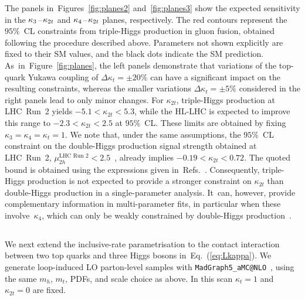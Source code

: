 \documentclass{SciPost}
\begin{document}
The panels in~Figures~\ref{fig:planes2} and~\ref{fig:planes3} show the expected sensitivity in the $\kappa_3\hspace{0.25mm}$--$\hspace{0.25mm}\kappa_{2t}$ and $\kappa_4\hspace{0.25mm}$--$\hspace{0.25mm}\kappa_{2t}$ planes, respectively. The red contours represent the $95\%$~CL constraints from triple-Higgs production in gluon fusion, obtained following the procedure described above. Parameters not shown explicitly are fixed to their SM values, and the black dots indicate the SM prediction. As~in~Figure~\ref{fig:planes}, the left panels demonstrate that variations of the top-quark Yukawa coupling of $\Delta\kappa_t=\pm20\%$ can have a significant impact on the resulting constraints, whereas the smaller variations $\Delta\kappa_t=\pm5\%$ considered in the right panels lead to only minor changes. For $\kappa_{2t}$, triple-Higgs production at LHC~Run~2 yields $-5.1 < \kappa_{2t} < 5.3$, while the HL-LHC is expected to improve this range to $-2.3 < \kappa_{2t} < 2.5$ at $95\%$~CL. These limits are obtained by fixing $\kappa_3=\kappa_4=\kappa_t=1$. We note that, under the same assumptions, the $95\%$~CL constraint on the double-Higgs production signal strength obtained at LHC~Run~2, $\mu_{2h}^{\text{LHC~Run~2}}<2.5$~\cite{CMS:2026nuu}, already implies $-0.19 < \kappa_{2t} < 0.72$. The quoted bound is obtained using the expressions given in~Refs.~\cite{Buchalla:2018yce,Brivio:2025sib}. Consequently, triple-Higgs production is not expected to provide a stronger constraint on $\kappa_{2t}$ than double-Higgs production in a single-parameter analysis. It~can, however, provide complementary information in multi-parameter fits, in particular when these involve~$\kappa_4$, which can only be weakly constrained by double-Higgs production~\cite{Bizon:2018syu,Borowka:2018pxx,Li:2024iio,Ding:2026qto}.

\subsection{}
\label{sec:kappa3t}

We next extend the inclusive-rate parametrisation to the contact interaction between two top quarks and three Higgs bosons in~Eq.~(\ref{eq:Lkappa}). We generate loop-induced LO parton-level samples with \texttt{MadGraph5\_aMC@NLO}~\cite{Alwall:2014hca}, using the same $m_h$, $m_t$, PDFs, and scale choice as above. In this scan $\kappa_t=1$ and $\kappa_{2t}=0$ are fixed.
\end{document}
